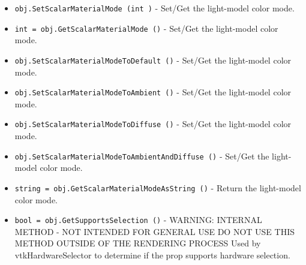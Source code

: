 \begin{itemize}
\item  \verb|obj.SetScalarMaterialMode (int )| -  Set/Get the light-model color mode. 

\item  \verb|int = obj.GetScalarMaterialMode ()| -  Set/Get the light-model color mode. 

\item  \verb|obj.SetScalarMaterialModeToDefault ()| -  Set/Get the light-model color mode. 

\item  \verb|obj.SetScalarMaterialModeToAmbient ()| -  Set/Get the light-model color mode. 

\item  \verb|obj.SetScalarMaterialModeToDiffuse ()| -  Set/Get the light-model color mode. 

\item  \verb|obj.SetScalarMaterialModeToAmbientAndDiffuse ()| -  Set/Get the light-model color mode. 

\item  \verb|string = obj.GetScalarMaterialModeAsString ()| -  Return the light-model color mode.

\item  \verb|bool = obj.GetSupportsSelection ()| -  WARNING: INTERNAL METHOD - NOT INTENDED FOR GENERAL USE
 DO NOT USE THIS METHOD OUTSIDE OF THE RENDERING PROCESS
 Used by vtkHardwareSelector to determine if the prop supports hardware
 selection.

\end{itemize}
